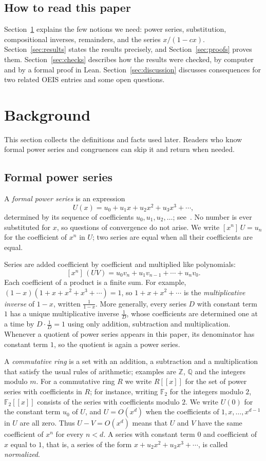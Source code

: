 \documentclass[11pt,a4paper]{article}
\theoremstyle{definition}
\theoremstyle{remark}
\newcommand{\Z}{\mathbb{Z}}
\newcommand{\Q}{\mathbb{Q}}
\newcommand{\F}{\mathbb{F}}
\newcommand{\ps}[1]{#1[[x]]}
\newcommand{\coeff}[2]{[x^{#1}]\,#2}
\begin{document}
\subsection{How to read this paper}
Section~\ref{sec:background} explains the few notions we need: power series, substitution, compositional inverses,
remainders, and the series $x/(1-cx)$. Section~\ref{sec:results} states the results precisely, and
Section~\ref{sec:proofs} proves them. Section~\ref{sec:checks} describes how the results were checked, by computer and
by a formal proof in Lean. Section~\ref{sec:discussion} discusses consequences for two related OEIS entries and some
open questions.
\section{Background}\label{sec:background}
This section collects the definitions and facts used later. Readers who know formal power series and congruences can skip it and return when needed.
\subsection{Formal power series}
A \emph{formal power series} is an expression
\[
U(x)=u_0+u_1x+u_2x^2+u_3x^3+\cdots ,
\]
determined by its sequence of coefficients $u_0,u_1,u_2,\dots$; see~\cite{niven,stanley}. No number is ever
substituted for $x$, so questions of convergence do not arise. We write $\coeff{n}{U}=u_n$ for the coefficient of $x^n$ in $U$; two series are equal
when all their coefficients are equal.

Series are added coefficient by coefficient and multiplied like polynomials:
\[
\coeff{n}{(UV)}=u_0v_n+u_1v_{n-1}+\cdots+u_nv_0 .
\]
Each coefficient of a product is a finite sum. For example, $(1-x)(1+x+x^2+x^3+\cdots)=1$, so $1+x+x^2+\cdots$ is
the \emph{multiplicative inverse} of $1-x$, written $\frac{1}{1-x}$. More generally, every series $D$ with constant term
$1$ has a unique multiplicative inverse $\frac1D$, whose coefficients are determined one at a time by $D\cdot\frac1D=1$
using only addition, subtraction and multiplication. Whenever a quotient of power series appears in this paper, its
denominator has constant term $1$, so the quotient is again a power series.

A \emph{commutative ring} is a set with an addition, a subtraction and a multiplication that satisfy the usual rules
of arithmetic; examples are $\Z$, $\Q$ and the integers modulo $m$. For a commutative ring $R$ we write $\ps{R}$ for
the set of power series with coefficients in $R$; for instance, writing $\F_2$ for the integers modulo $2$, $\ps{\F_2}$
consists of the series with coefficients modulo $2$. We write
$U(0)$ for the constant term $u_0$ of $U$, and $U=O(x^d)$ when the coefficients of $1,x,\dots,x^{d-1}$ in $U$ are all
zero. Thus $U-V=O(x^d)$ means that $U$ and $V$ have the same coefficient of $x^n$ for every $n<d$. A series with
constant term $0$ and coefficient of $x$ equal to $1$, that is, a series of the form $x+u_2x^2+u_3x^3+\cdots$, is
called \emph{normalized}.
\end{document}
